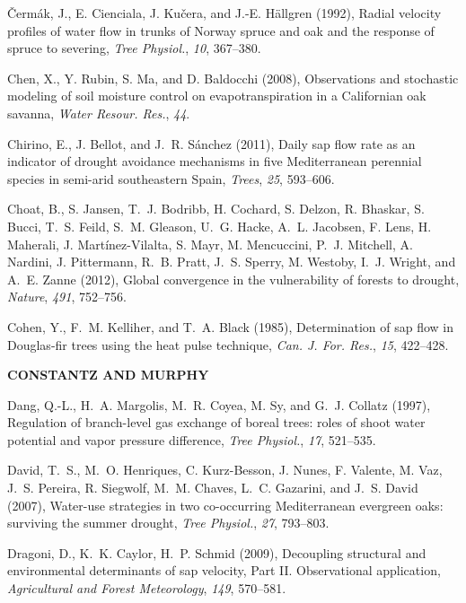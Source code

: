 \v{C}erm\'{a}k, J., E. Cienciala, J. Ku\v{c}era, and J.-E. H\"{a}llgren (1992), Radial velocity profiles of water flow in trunks of Norway spruce and oak and the response of spruce to severing, 
\textit{Tree Physiol.}, \textit{10}, 367--380.

Chen, X., Y. Rubin, S. Ma, and D. Baldocchi (2008), Observations and stochastic modeling of soil moisture control on evapotranspiration in a Californian oak savanna,
\textit{Water Resour. Res.}, \textit{44}.

Chirino, E., J. Bellot, and J.~R. S\'anchez (2011), Daily sap flow rate as an indicator of drought avoidance mechanisms in five Mediterranean perennial species in semi-arid southeastern Spain,
\textit{Trees}, \textit{25}, 593--606.

Choat, B., S. Jansen, T.~J. Bodribb, H. Cochard, S. Delzon, R. Bhaskar, S. Bucci, T.~S. Feild, S.~M. Gleason, U.~G. Hacke, A.~L. Jacobsen, F. Lens, H. Maherali, J. Mart\'{i}nez-Vilalta, S. Mayr, M. Mencuccini, P.~J. Mitchell, A. Nardini, J. Pittermann, R.~B. Pratt, J.~S. Sperry, M. Westoby, I.~J. Wright, and A.~E. Zanne (2012), Global convergence in the vulnerability of forests to drought, 
\textit{Nature}, \textit{491}, 752--756.

Cohen, Y., F.~M. Kelliher, and T.~A. Black (1985), Determination of sap flow in Douglas-fir trees using the heat pulse technique, 
\textit{Can. J. For. Res.}, \textit{15}, 422--428.

\textbf{CONSTANTZ AND MURPHY}

Dang, Q.-L., H.~A. Margolis, M.~R. Coyea, M. Sy, and G.~J. Collatz (1997), Regulation of branch-level gas exchange of boreal trees: roles of shoot water potential and vapor pressure difference, 
\textit{Tree Physiol.}, \textit{17}, 521--535.

David, T.~S., M.~O. Henriques, C. Kurz-Besson, J. Nunes, F. Valente, M. Vaz, J.~S. Pereira, R. Siegwolf, M.~M. Chaves, L.~C. Gazarini, and J.~S. David (2007), Water-use strategies in two co-occurring Mediterranean evergreen oaks: surviving the summer drought,
\textit{Tree Physiol.}, \textit{27}, 793--803.

Dragoni, D., K.~K. Caylor, H.~P. Schmid (2009), Decoupling structural and environmental determinants of sap velocity, Part II. Observational application,
\textit{Agricultural and Forest Meteorology}, \textit{149}, 570--581.

